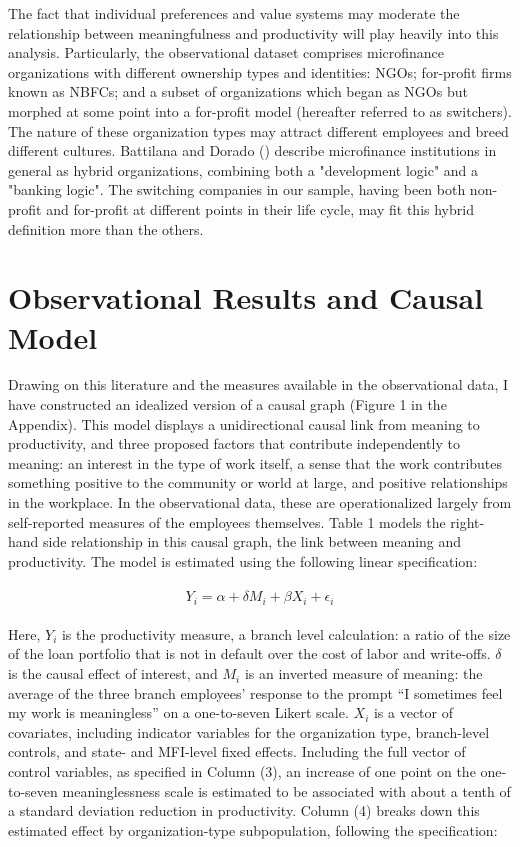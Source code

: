 \documentclass[12pt]{article}
\begin{document}
The fact that individual preferences and value systems may moderate the relationship between meaningfulness and productivity will play heavily into this analysis. Particularly, the observational dataset comprises microfinance organizations with different ownership types and identities: NGOs; for-profit firms known as NBFCs; and a subset of organizations which began as NGOs but morphed at some point into a for-profit model (hereafter referred to as switchers). The nature of these organization types may attract different employees and breed different cultures. Battilana and Dorado (\citeyear{Battilana:10}) describe microfinance institutions in general as hybrid organizations, combining both a "development logic" and a "banking logic". The switching companies in our sample, having been both non-profit and for-profit at different points in their life cycle, may fit this hybrid definition more than the others. 

\section{Observational Results and Causal Model}

Drawing on this literature and the measures available in the observational data, I have constructed an idealized version of a causal graph (Figure 1 in the Appendix). This model displays a unidirectional causal link from meaning to productivity, and three proposed factors that contribute independently to meaning: an interest in the type of work itself, a sense that the work contributes something positive to the community or world at large, and positive relationships in the workplace. In the observational data, these are operationalized largely from self-reported measures of the employees themselves. Table 1 models the right-hand side relationship in this causal graph, the link between meaning and productivity. The model is estimated using the following linear specification:

\begin{align} 
\begin{split}
Y_i = \alpha + \delta M_i + \beta X_i + \epsilon_i
\end{split}					
\end{align}

Here, $Y_i$ is the productivity measure, a branch level calculation: a ratio of the size of the loan portfolio that is not in default over the cost of labor and write-offs. $\delta$ is the causal effect of interest, and $M_i$ is an inverted measure of meaning: the average of the three branch employees' response to the prompt ``I sometimes feel my work is meaningless'' on a one-to-seven Likert scale.  $X_i$ is a vector of covariates, including indicator variables for the organization type, branch-level controls, and state- and MFI-level fixed effects. Including the full vector of control variables, as specified in Column (3), an increase of one point on the one-to-seven meaninglessness scale is estimated to be associated with about a tenth of a standard deviation reduction in productivity. Column (4) breaks down this estimated effect by organization-type subpopulation, following the specification:
\end{document}
